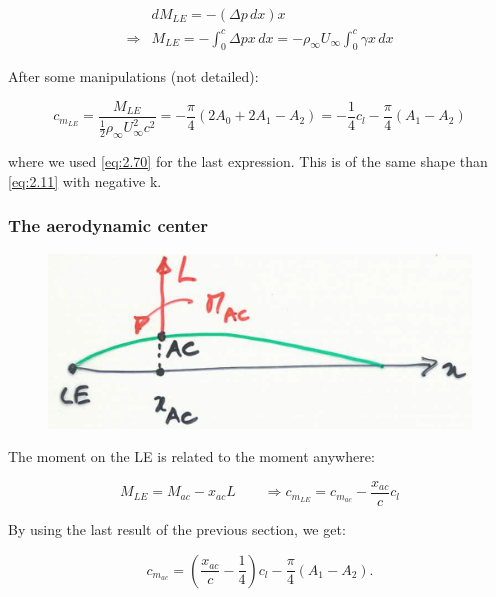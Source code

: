 	\begin{equation}
	\begin{aligned}
	&dM_{LE} = - (\Delta p \, dx) x \\ 
	\Rightarrow &M_{LE} = -\int _0 ^c \Delta p x \, dx = - \rho _\infty U_\infty \int _0^c \gamma x \, dx
	\end{aligned}
	\end{equation}
	
	After some manipulations (not detailed):
	
	\begin{equation}
	c_{m_{LE}} = \frac{M_{LE}}{\frac{1}{2}\rho _\infty U_\infty ^2 c^2} = - \frac{\pi}{4} (2A_0 + 2A_1 - A_2) = -\frac{1}{4} c_l - \frac{\pi}{4} (A_1 - A_2)
	\end{equation}
	
	where we used \eqref{eq:2.70} for the last expression. This is of the same shape than \eqref{eq:2.11} with negative k. 
	
\subsubsection{The aerodynamic center}
	\begin{figure}
	\vspace{-5mm}
	\includegraphics[scale=0.2]{ch2/35}
	\end{figure}
	The moment on the LE is related to the moment anywhere:
	
	\begin{equation}
	M_{LE} = M_{ac} - x_{ac} L \qquad \Rightarrow c_{m_{LE}} =c_{m_{ac}} - \frac{x_{ac}}{c}c_{l} 
	\end{equation}
	
	By using the last result of the previous section, we get: 
	
	\begin{equation}
	c_{m_{ac}} = \left( \frac{x_{ac}}{c} - \frac{1}{4} \right) c_l - \frac{\pi}{4} (A_1 -A_2).
	\end{equation}
	
